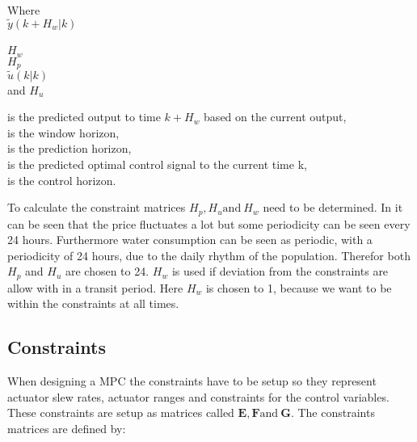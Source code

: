  \begin{minipage}[t]{0.20\textwidth}
 Where\\
 \hspace*{8mm} $\tilde y(k+H_w|k)$ \\
 \textcolor{White}{te} \\
 \hspace*{8mm} $H_w$ \\
 \hspace*{8mm} $H_p$ \\
 \hspace*{8mm} $\tilde u(k|k)$\\
 and \hspace*{0.7mm} $H_u$	
 \end{minipage}
 \begin{minipage}[t]{0.68\textwidth}
 \vspace*{2mm}
 is the predicted output to time $k+H_w$ based on the current output, \\
 is the window horizon,\\
 is the prediction horizon,\\
 is the predicted optimal control signal to the current time k, \\
 is the control horizon.
 \end{minipage}

To calculate the constraint matrices $H_p, H_u \text{and} \: H_w$ need to be determined. In  it can be seen that the price fluctuates a lot but some periodicity can be seen every 24 hours. Furthermore water consumption can be seen as periodic, with a periodicity of 24 hours, due to the daily rhythm of the population. Therefor both $H_p$ and $ H_u $ are chosen to 24. $H_w$ is used if deviation from the constraints are allow with in a transit period. Here $H_w$ is chosen to 1, because we want to be within the constraints at all times. 


\subsection{Constraints}

When designing a MPC the constraints have to be setup so they represent actuator slew rates, actuator ranges and constraints for the control variables. These constraints are setup as matrices called $\pmb{E}, \pmb{F} \text{and} \:\pmb{G}$. The constraints matrices are defined by: 

